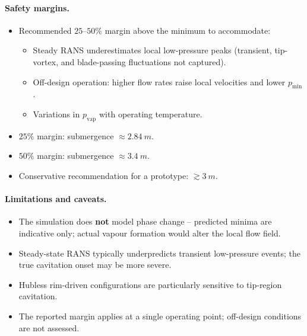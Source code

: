 \paragraph{Safety margins.}
\begin{itemize}
    \item Recommended $25\text{--}50\%$ margin above the minimum to accommodate:
    \begin{itemize}
        \item Steady RANS underestimates local low-pressure peaks (transient, tip-vortex, and blade-passing fluctuations not captured).
        \item Off-design operation: higher flow rates raise local velocities and lower $p_\mathrm{min}$.
        \item Variations in $p_\mathrm{vap}$ with operating temperature.
    \end{itemize}
    \item $25\%$ margin: submergence $\approx \SI{2.84}{m}$.
    \item $50\%$ margin: submergence $\approx \SI{3.4}{m}$.
    \item Conservative recommendation for a prototype: $\gtrsim \SI{3}{m}$.
\end{itemize}

\paragraph{Limitations and caveats.}
\begin{itemize}
    \item The simulation does \textbf{not} model phase change -- predicted minima are indicative only; actual vapour formation would alter the local flow field.
    \item Steady-state RANS typically underpredicts transient low-pressure events; the true cavitation onset may be more severe.
    \item Hubless rim-driven configurations are particularly sensitive to tip-region cavitation.
    \item The reported margin applies at a single operating point; off-design conditions are not assessed.
\end{itemize}


